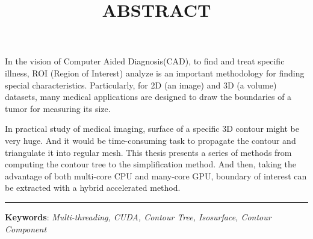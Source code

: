 \documentclass[11pt,b5paper]{article}
\title{\huge{ABSTRACT}}
\date{}
\begin{document}
\maketitle{}
\setcounter{page}{39}
In the vision of Computer Aided Diagnosis(CAD), to find and treat specific
illness, ROI (Region of Interest) analyze is an important methodology for
finding special characteristics. Particularly, for 2D (an image) and 3D
(a volume) datasets, many medical applications are designed to draw the
boundaries of a tumor for measuring its size.

In practical study of medical imaging, surface of a specific 3D contour might
be very huge. And it would be time-consuming task to propagate the contour and
triangulate it into regular mesh. This thesis presents a series of methods
from computing the contour tree to the simplification method. And then, taking
the advantage of both multi-core CPU and many-core GPU, boundary of interest
can be extracted with a hybrid accelerated method.
\vfill{}
\noindent\rule{\linewidth}{0.2mm}

\noindent\small{\textbf{Keywords}: \textit{Multi-threading, CUDA, Contour Tree, Isosurface, Contour Component}}
\end{document}
